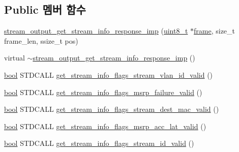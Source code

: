 \subsection*{Public 멤버 함수}
\begin{DoxyCompactItemize}
\item 
\hyperlink{classavdecc__lib_1_1stream__output__get__stream__info__response__imp_a1c82d2ec02941aa290c219d2a0a5440e}{stream\+\_\+output\+\_\+get\+\_\+stream\+\_\+info\+\_\+response\+\_\+imp} (\hyperlink{stdint_8h_aba7bc1797add20fe3efdf37ced1182c5}{uint8\+\_\+t} $\ast$\hyperlink{gst__avb__playbin_8c_ac8e710e0b5e994c0545d75d69868c6f0}{frame}, size\+\_\+t frame\+\_\+len, ssize\+\_\+t pos)
\item 
virtual \hyperlink{classavdecc__lib_1_1stream__output__get__stream__info__response__imp_a5c188697d6509edb8ab575c26d26eafb}{$\sim$stream\+\_\+output\+\_\+get\+\_\+stream\+\_\+info\+\_\+response\+\_\+imp} ()
\item 
\hyperlink{avb__gptp_8h_af6a258d8f3ee5206d682d799316314b1}{bool} S\+T\+D\+C\+A\+LL \hyperlink{classavdecc__lib_1_1stream__output__get__stream__info__response__imp_a6a60826aa7a0e78e97eb38892cb0fa60}{get\+\_\+stream\+\_\+info\+\_\+flags\+\_\+stream\+\_\+vlan\+\_\+id\+\_\+valid} ()
\item 
\hyperlink{avb__gptp_8h_af6a258d8f3ee5206d682d799316314b1}{bool} S\+T\+D\+C\+A\+LL \hyperlink{classavdecc__lib_1_1stream__output__get__stream__info__response__imp_a18e2eec8784db9a04cc61196b3214c90}{get\+\_\+stream\+\_\+info\+\_\+flags\+\_\+msrp\+\_\+failure\+\_\+valid} ()
\item 
\hyperlink{avb__gptp_8h_af6a258d8f3ee5206d682d799316314b1}{bool} S\+T\+D\+C\+A\+LL \hyperlink{classavdecc__lib_1_1stream__output__get__stream__info__response__imp_a9abc3deb6bb3d8a854f59f5062194c1f}{get\+\_\+stream\+\_\+info\+\_\+flags\+\_\+stream\+\_\+dest\+\_\+mac\+\_\+valid} ()
\item 
\hyperlink{avb__gptp_8h_af6a258d8f3ee5206d682d799316314b1}{bool} S\+T\+D\+C\+A\+LL \hyperlink{classavdecc__lib_1_1stream__output__get__stream__info__response__imp_acaf4f9080f85559bfadc7a4ac6d67e7d}{get\+\_\+stream\+\_\+info\+\_\+flags\+\_\+msrp\+\_\+acc\+\_\+lat\+\_\+valid} ()
\item 
\hyperlink{avb__gptp_8h_af6a258d8f3ee5206d682d799316314b1}{bool} S\+T\+D\+C\+A\+LL \hyperlink{classavdecc__lib_1_1stream__output__get__stream__info__response__imp_a36fe42e1dc53a6caaf6db2c4b44926d7}{get\+\_\+stream\+\_\+info\+\_\+flags\+\_\+stream\+\_\+id\+\_\+valid} ()
\item 

\end{DoxyCompactItemize}
